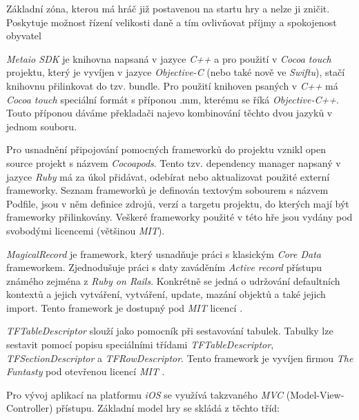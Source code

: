 \documentclass[twoside,12pt]{article}
\begin{document}
Základní zóna, kterou má hráč již postavenou na startu hry a nelze ji zničit. Poskytuje možnost řízení velikosti daně a tím ovlivňovat příjmy a spokojenost obyvatel

\textit{Metaio SDK} je knihovna napsaná v jazyce \textit{C++} a pro použití v \textit{Cocoa touch} projektu, který je vyvíjen v jazyce \textit{Objective-C} (nebo také nově ve \textit{Swiftu}), stačí knihovnu přilinkovat do tzv. bundle. Pro použití knihoven psaných v \textit{C++} má \textit{Cocoa touch} speciální formát s příponou .mm, kterému se říká \textit{Objective-C++}. Touto příponou dáváme překladači najevo kombinování těchto dvou jazyků v jednom souboru. 

Pro usnadnění připojování pomocných frameworků do projektu vznikl open source projekt s názvem \textit{Cocoapods}. Tento tzv. dependency manager napsaný v jazyce \textit{Ruby} má za úkol přidávat, odebírat nebo aktualizovat použité externí frameworky. Seznam frameworků je definován textovým sobourem s názvem Podfile, jsou v něm definice zdrojů, verzí a targetu projektu, do kterých mají být frameworky přilinkovány. Veškeré frameworky použité v této hře jsou vydány pod svobodými licencemi (většinou \textit{MIT}).

\textit{MagicalRecord} je framework, který usnadňuje práci s klasickým \textit{Core Data} frameworkem. Zjednodušuje práci s daty zaváděním \textit{Active record} přístupu známého zejména z \textit{Ruby on Rails}. Konkrétně se jedná o udržování defaultních kontextů a jejich vytváření, vytváření, update, mazání objektů a také jejich import. Tento framework je dostupný pod \textit{MIT} licencí \cite{magical_record}.

\textit{TFTableDescriptor} slouží jako pomocník při sestavování tabulek. Tabulky lze sestavit pomocí popisu  speciálními třídami \textit{TFTableDescriptor}, \textit{TFSectionDescriptor} a \textit{TFRowDescriptor}. Tento framework je vyvíjen firmou \textit{The Funtasty} pod otevřenou licencí \textit{MIT} \cite{tftabledescriptor}.

Pro vývoj aplikací na platformu \textit{iOS} se využívá takzvaného \textit{MVC} (Model-View-Controller) přístupu. Základní model hry se skládá z těchto tříd:
\end{document}
